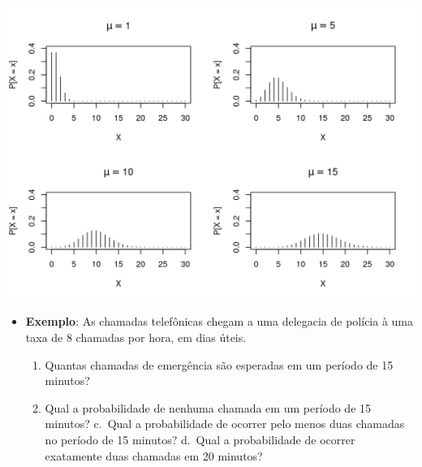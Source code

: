 \documentclass[
  10pt,
  a4paper]{book}
\providecommand{\tightlist}{%
  \setlength{\itemsep}{0pt}\setlength{\parskip}{0pt}}
\begin{document}
\begin{center}\includegraphics{figures/unnamed-chunk-351-1} \end{center}

\begin{itemize}
\tightlist
\item
  \textbf{Exemplo}: As chamadas telefônicas chegam a uma delegacia de
  polícia à uma taxa de 8 chamadas por hora, em dias úteis.

  \begin{enumerate}
  \def\labelenumi{\alph{enumi}.}
  \tightlist
  \item
    Quantas chamadas de emergência são esperadas em um período de 15 minutos?
  \item
    Qual a probabilidade de nenhuma chamada em um período de 15 minutos?
    c.~Qual a probabilidade de ocorrer pelo menos duas chamadas no período de 15 minutos?
    d.~Qual a probabilidade de ocorrer exatamente duas chamadas em 20 minutos?
  \end{enumerate}
\end{itemize}
\end{document}
